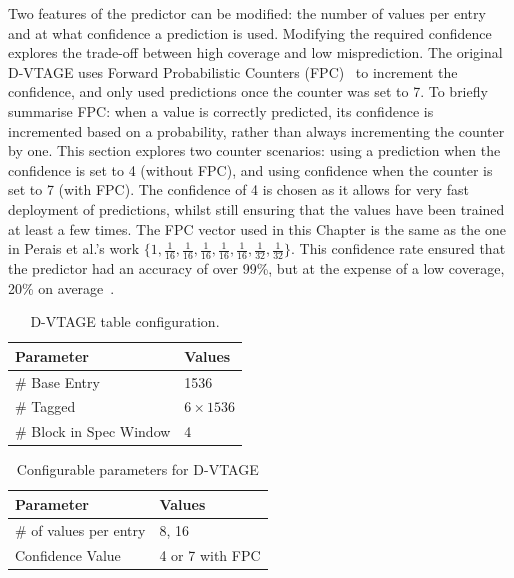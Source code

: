 Two features of the predictor can be modified: the number of values per entry and at what confidence a prediction is used.
Modifying the required confidence explores the trade-off between high coverage and low misprediction.
The original D-VTAGE uses Forward Probabilistic Counters (FPC)~\cite{riley2006fpc} to increment the confidence, and only used predictions once the counter was set to 7.
To briefly summarise FPC: when a value is correctly predicted, its confidence is incremented based on a probability, rather than always incrementing the counter by one.
This section explores two counter scenarios: using a prediction when the confidence is set to 4 (without FPC), and using confidence when the counter is set to 7 (with FPC).
The confidence of 4 is chosen as it allows for very fast deployment of predictions, whilst still ensuring that the values have been trained at least a few times.
The FPC vector used in this Chapter is the same as the one in Perais et al.'s work $\{1,\frac{1}{16},\frac{1}{16},\frac{1}{16},\frac{1}{16},\frac{1}{16},\frac{1}{32},\frac{1}{32}\}$.
This confidence rate ensured that the predictor had an accuracy of over 99\%, but at the expense of a low coverage, 20\% on average~\cite{peraisBeBop2015}.

\begin{table}[t]
\small
\centering
\begin{tabular}{p{5.2cm} p{1.8cm}}
\toprule
\textbf{Parameter} & \textbf{Values} \\ \midrule
\# Base Entry & 1536\\
\# Tagged & $6\times1536$\\
\# Block in Spec Window & 4 \\ \hline
\end{tabular}
  \caption{D-VTAGE table configuration.}\label{tab:vtage-conf}
\vspace{1em}
\end{table}


\begin{table}[t]
\small
\centering
\begin{tabular}{p{5.2cm} p{1.8cm}}
\toprule
\textbf{Parameter} & \textbf{Values} \\ \midrule
\# of values per entry & 8, 16\\
Confidence Value & 4 or 7 with FPC \\ \bottomrule
\end{tabular}
\caption{Configurable parameters for D-VTAGE}\label{tab:vtage-params}
\end{table}

